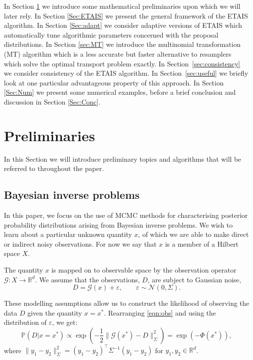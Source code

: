 \documentclass[final]{siamltex}
\newcommand{\data}{D}
\begin{document}
In Section \ref{Sec:Prelim} we introduce some mathematical
preliminaries upon which we will later rely. In Section \ref{Sec:ETAIS}
we present the general framework of the ETAIS algorithm. In Section
\ref{Sec:adapt} we consider adaptive versions of ETAIS which
automatically tune algorithmic parameters concerned with the proposal
distributions. In Section \ref{sec:MT} we introduce the {\red multinomial transformation (MT)} algorithm which is a less accurate but
faster alternative to resamplers which solve the optimal transport
problem exactly. In Section~\ref{sec:consistency} we consider
consistency of the ETAIS algorithm. {\red In Section~\ref{sec:useful} we briefly look at one
particular advantageous property of this approach.} In Section \ref{Sec:Num} we present
some numerical examples, before a brief conclusion and discussion in
Section \ref{Sec:Conc}.


\section{Preliminaries}\label{Sec:Prelim}

In this Section we will introduce preliminary topics and algorithms
that will be referred to throughout the paper.


\subsection{Bayesian inverse problems}
In this paper, we focus on the use of MCMC methods for characterising
posterior probability distributions arising from Bayesian inverse problems. We
wish to learn about a particular unknown quantity $x$, of which we are
able to make direct or indirect noisy observations. For now
we say that $x$ is a member of a Hilbert
space $X$. 

The quantity $x$ is mapped on to observable space by the observation
operator $\mathcal{G}:X \to\mathbb{R}^d$. We assume that the
observations, $\data$, are subject to Gaussian noise,
\begin{equation}\label{eqn:obs}
	\data = \mathcal{G}(x) + \varepsilon, \qquad \varepsilon \sim \mathcal{N}(0,\Sigma).
\end{equation}

These modelling assumptions allow us to construct the 
likelihood of observing the data $\data$ given the quantity $x =
x^*$. Rearranging \eqref{eqn:obs} and using the distribution of
$\varepsilon$, we get:
\begin{equation}\label{eqn:like}
	\mathbb{P}(\data|x=x^*) \propto \exp \left ( -\frac{1}{2} \|\mathcal{G}(x^*)
	  - \data\|_\Sigma^2 \right ) = \exp\left(-\Phi(x^*)\right),
\end{equation}
where $\| y_1 - y_2 \|^2_\Sigma = (y_1-y_2)^\top\Sigma^{-1}(y_1-y_2)$
for $y_1,y_2 \in \mathbb{R}^d$.
\end{document}
